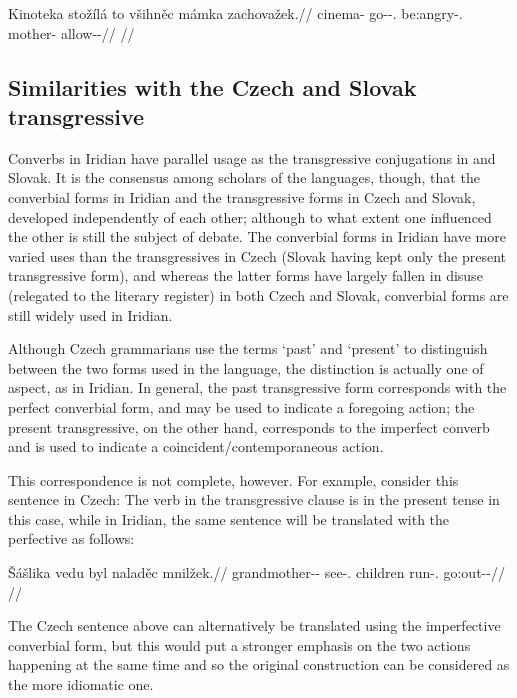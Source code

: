 \pex
\begingl
\gla Kinoteka stožílá to všihněc mámka zachovažek.//
\glb cinema-\Acc{} go-\Av{}-\Sbj{}.\Ipf{} \Rz{} be:angry-\Cv{}.\Ipf{} mother-\Dim{} allow-\Av{}-\Pf{}//
\glft {}//
\endgl
\xe


\subsection{Similarities with the Czech and Slovak transgressive}

Converbs in Iridian have parallel usage as the
transgressive conjugations in 
and Slovak. It is the consensus among scholars of the languages,
though, that the converbial forms in Iridian and the transgressive forms in
Czech and Slovak, developed independently of each other; although to what extent
one influenced the other is still the subject of debate. The converbial forms in
Iridian have more varied uses than the transgressives in Czech (Slovak having
kept only the present transgressive form), and whereas the latter forms have
largely fallen in disuse (relegated to the literary register) in both Czech and
Slovak, converbial forms are still widely used in Iridian.

Although Czech grammarians use the terms `past' and `present' to distinguish
between the two forms used in the language, the distinction is actually one of
aspect, as in Iridian. In general, the past transgressive form
corresponds with the perfect converbial form, and may be used to indicate a
foregoing action; the present transgressive, on the other hand, corresponds to
the imperfect converb and is used to indicate a coincident/contemporaneous
action.

This correspondence is not complete, however. For example, consider this
sentence in Czech:  The verb in the
transgressive clause is in the present tense in this case, while in Iridian, the
same sentence will be translated with the perfective as follows:

\pex
\begingl
\gla Šášlika vedu byl naladěc mnilžek.//
\glb grandmother-\Dim{}-\Acc{} see-\Cv{}.\Pf{} children run-\Cv{}.\Ipf{} go:out-\Av{}-\Pf{}//
\glft {}//
\endgl
\xe

The Czech sentence above can alternatively be translated using the
imperfective converbial form, but this would put a stronger emphasis on the two
actions happening at the same time and so the original construction can be
considered as the more idiomatic one.

